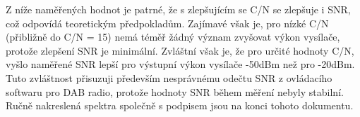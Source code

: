 \documentclass[10pt, a4paper]{article}%
\begin{document}
Z níže naměřených hodnot je patrné, že s zlepšujícím se C/N se zlepšuje i SNR, což odpovídá teoretickým předpokladům. Zajímavé však je, pro
nízké C/N (přibližně do C/N = 15) nemá téměř žádný význam zvyšovat výkon vysílače, protože zlepšení SNR je minimální. Zvláštní však je, že
pro určité hodnoty C/N, vyšlo naměřené SNR lepší pro výstupní výkon vysílače -50dBm než pro -20dBm. Tuto zvláštnost přisuzuji
především nesprávnému odečtu SNR z ovládacího softwaru pro DAB radio, protože hodnoty SNR během měření nebyly stabilní. Ručně nakreslená spektra
společně s podpisem jsou na konci tohoto dokumentu.
\begin{table}[ht!]
    \begin{minipage}{0.5\textwidth}
\end{minipage}
\end{table}
\end{document}
